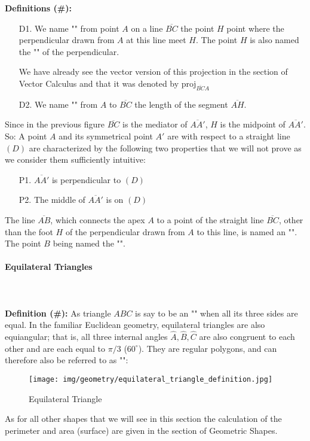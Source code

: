 	\textbf{Definitions (\#\mydef):}
	\begin{enumerate}
		\item[D1.] We name "" from point $A$ on a line $\overline{BC}$ the point $H$ point where the perpendicular drawn from $A$ at this line meet $H$. The  point $H$ is also named the "" of the perpendicular.

		We have already see the vector version of this projection in the section of Vector Calculus and that it was denoted by $\text{proj}_{\overline{BC} A}$

		\item[D2.] We name "" from $A$ to $\overline{BC}$ the length of the segment $\overline{AH}$.
	\end{enumerate}
	Since in the previous figure $\overline{BC}$ is the mediator of $\overline{AA'}$, $H$ is the midpoint of $\overline{AA'}$. So: A point $A$ and its symmetrical point $A'$ are with respect to a straight line $(D)$ are characterized by the following two properties that we will not prove as we consider them sufficiently intuitive:
	\begin{enumerate}
		\item[P1.] $\overline{AA'}$ is perpendicular to $(D)$
		
		\item[P2.]  The middle of $\overline{AA'}$ is on $(D)$
	\end{enumerate}
	The line $\overline{AB}$, which connects the apex $A$ to a point of the straight line $\overline{BC}$, other than the foot $H$ of the perpendicular drawn from $A$ to this line, is named an "". The point $B$ being named the "".
	
	\pagebreak
	\paragraph{Equilateral Triangles}\mbox{}\\\\
	\textbf{Definition (\#\mydef):} As triangle $ABC$ is say to be an "" when all its three sides are equal. In the familiar Euclidean geometry, equilateral triangles are also equiangular; that is, all three internal angles $\hat{A},\hat{B},\hat{C}$ are also congruent to each other and are each equal to $\pi/3$ ($60^\circ$). They are regular polygons, and can therefore also be referred to as "":
	\begin{figure}[H]
		\centering
		\texttt{[image: img/geometry/equilateral\_triangle\_definition.jpg]}
		\caption{Equilateral Triangle}
	\end{figure}
	As for all other shapes that we will see in this section the calculation of the perimeter and area (surface) are given in the section of Geometric Shapes.
	
